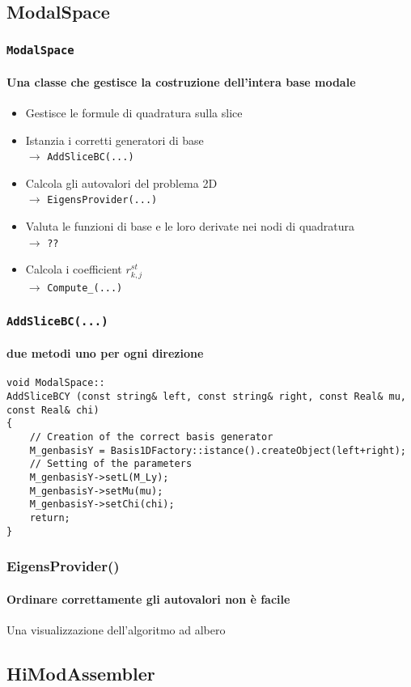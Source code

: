\subsection{ModalSpace}
\begin{frame}
 \frametitle{\texttt{ModalSpace}}
 \framesubtitle{Una classe che gestisce la costruzione dell'intera base modale}
 \begin{itemize}
  \item Gestisce le formule di quadratura sulla slice
  \item Istanzia i corretti generatori di base\\
  $\rightarrow$ \texttt{AddSliceBC(...)}
  \item Calcola gli autovalori del problema 2D\\
  $\rightarrow$ \texttt{EigensProvider(...)}
  \item Valuta le funzioni di base e le loro derivate nei nodi di quadratura\\
  $\rightarrow$ \texttt{??}
  \item Calcola i coefficient $r^{st}_{k,j}$\\
  $\rightarrow$ \texttt{Compute\_\*(...)}
 \end{itemize}
\end{frame}
\begin{frame}[fragile]
\frametitle{\texttt{AddSliceBC(...)}}
\framesubtitle{due metodi uno per ogni direzione}
\begin{lstlisting}[style = general]
void ModalSpace::
AddSliceBCY (const string& left, const string& right, const Real& mu, const Real& chi)
{
	// Creation of the correct basis generator
	M_genbasisY = Basis1DFactory::istance().createObject(left+right);
	// Setting of the parameters
	M_genbasisY->setL(M_Ly);
	M_genbasisY->setMu(mu);
	M_genbasisY->setChi(chi);
	return;
}
\end{lstlisting}
\end{frame}

\begin{frame}
 \frametitle{EigensProvider()}
 \framesubtitle{Ordinare correttamente gli autovalori non \`e facile}
 Una visualizzazione dell'algoritmo ad albero
\end{frame}


\subsection{HiModAssembler}